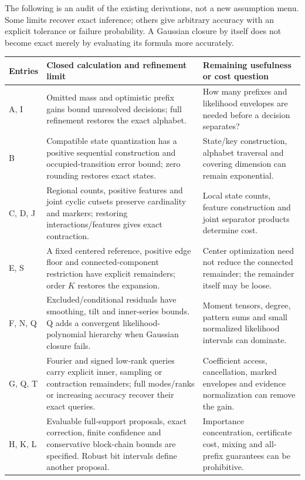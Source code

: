 \documentclass[10pt,a4paper]{article}
\begin{document}
The following is an audit of the existing derivations, not a new assumption menu. Some limits recover
exact inference; others give arbitrary accuracy with an explicit tolerance or failure probability.
A Gaussian closure by itself does not become exact merely by evaluating its formula more accurately.

\begin{center}\small
\begin{tabularx}{\textwidth}{@{}p{}YY@{}}\toprule
Entries & Closed calculation and refinement limit & Remaining usefulness or cost question\\\midrule
A, I & Omitted mass and optimistic prefix gains bound unresolved decisions; full refinement restores the exact alphabet. &
How many prefixes and likelihood envelopes are needed before a decision separates?\\
B & Compatible state quantization has a positive sequential construction and occupied-transition error bound; zero rounding restores exact states. &
State/key construction, alphabet traversal and covering dimension can remain exponential.\\
C, D, J & Regional counts, positive features and joint cyclic cutsets preserve cardinality and markers; restoring interactions/features gives exact contraction. &
Local state counts, feature construction and joint separator products determine cost.\\
E, S & A fixed centered reference, positive edge floor and connected-component restriction have explicit remainders; order $K$ restores the expansion. &
Center optimization need not reduce the connected remainder; the remainder itself may be loose.\\
F, N, Q & Excluded/conditional residuals have smoothing, tilt and inner-series bounds. Q adds a convergent likelihood-polynomial hierarchy when Gaussian closure fails. &
Moment tensors, degree, pattern sums and small normalized likelihood intervals can dominate.\\
G, Q, T & Fourier and signed low-rank queries carry explicit inner, sampling or contraction remainders; full modes/ranks or increasing accuracy recover their exact queries. &
Coefficient access, cancellation, marked envelopes and evidence normalization can remove the gain.\\
H, K, L & Evaluable full-support proposals, exact correction, finite confidence and conservative block-chain bounds are specified. Robust bit intervals define another proposal. &
Importance concentration, certificate cost, mixing and all-prefix guarantees can be prohibitive.\\

\end{tabularx}
\end{center}
\end{document}
